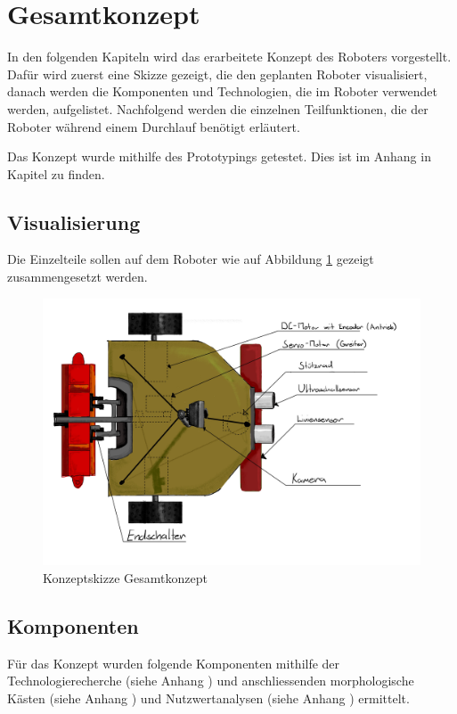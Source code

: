 \section{Gesamtkonzept}

In den folgenden Kapiteln wird das erarbeitete Konzept des Roboters vorgestellt. Dafür wird zuerst eine Skizze gezeigt, die den geplanten Roboter visualisiert, danach werden die Komponenten und Technologien, die im Roboter verwendet werden, aufgelistet. Nachfolgend werden die einzelnen Teilfunktionen, die der Roboter während einem Durchlauf benötigt erläutert. 

Das Konzept wurde mithilfe des Prototypings getestet. Dies ist im Anhang in Kapitel  zu finden.

\subsection{Visualisierung}

Die Einzelteile sollen auf dem Roboter wie auf Abbildung \ref{fig:robot_concept-scetch_labeld} gezeigt zusammengesetzt werden.

\begin{figure}[H]
\centering
\includegraphics[width=\textwidth]{assets/gesamtkonzept/Skizze-Fahrzeugkonzept-Beschriftet.jpg}
\caption{Konzeptskizze Gesamtkonzept}
\label{fig:robot_concept-scetch_labeld}
\end{figure}

\subsection{Komponenten}
Für das Konzept wurden folgende Komponenten mithilfe der Technologierecherche (siehe Anhang ) und anschliessenden morphologische Kästen (siehe Anhang ) und Nutzwertanalysen (siehe Anhang ) ermittelt. 


